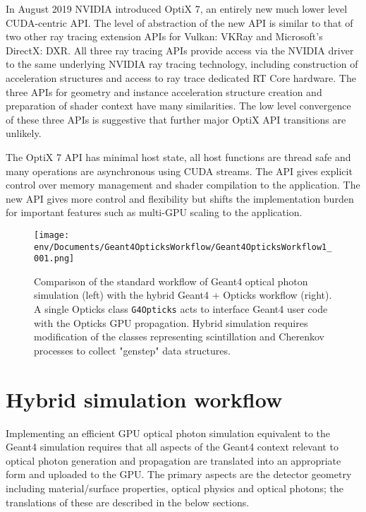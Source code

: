 \documentclass{webofc}
\newcommand{\comment}[1]{}
\begin{document}
%
In August 2019 NVIDIA introduced OptiX 7, an entirely new much lower level CUDA-centric API\cite{optix7}.
The level of abstraction of the new API is similar to that of two other ray tracing extension APIs for Vulkan: VKRay and Microsoft's DirectX: DXR. 
All three ray tracing APIs provide access via the NVIDIA driver to the same underlying NVIDIA ray tracing technology, 
including construction of acceleration structures and access to ray trace dedicated RT Core hardware. 
The three APIs for geometry and instance acceleration structure creation and preparation of shader context 
have many similarities. The low level convergence of these three APIs is suggestive that further major OptiX API transitions 
are unlikely. 

The OptiX 7 API has minimal host state, all host functions are thread safe and many operations are asynchronous using CUDA streams.
The API gives explicit control over memory management and shader compilation to the application.
The new API gives more control and flexibility but shifts the implementation burden for important features 
such as multi-GPU scaling to the application.  
\comment{
Earlier API versions provided a convenient GPU geometry
context which is the new API must be constructed at a much lower level in the form of the Shader Binding Table (SBT). 
}
%
%
%
%
\begin{figure}[t]
\centering
\texttt{[image: env/Documents/Geant4OpticksWorkflow/Geant4OpticksWorkflow1\_001.png]}
\caption{Comparison of the standard workflow of Geant4 optical photon simulation (left) with the hybrid Geant4 + Opticks workflow (right).
A single Opticks class {\tt G4Opticks} acts to interface Geant4 user code with the Opticks GPU propagation. 
Hybrid simulation requires modification of the classes representing scintillation and Cherenkov processes
to collect "genstep" data structures.}
\label{workflow} 
\end{figure}
%
\section{Hybrid simulation workflow}
\label{secworkflow}
%
Implementing an efficient GPU optical photon simulation equivalent to the Geant4 simulation 
requires that all aspects of the Geant4 context relevant to optical photon generation and 
propagation are translated into an appropriate form and uploaded to the GPU. 
The primary aspects are the detector geometry including material/surface properties, optical physics and optical photons; 
the translations of these are described in the below sections.
\end{document}
